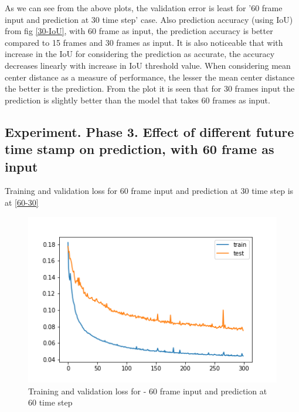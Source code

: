 



As we can see from the above plots, the validation error is least for '60 frame input and prediction at 30 time step' case. Also prediction accuracy (using IoU) from fig \ref{30-IoU}, with 60 frame as input, the prediction accuracy is better compared to 15 frames and 30 frames as input. It is also noticeable that with increase in the IoU for considering the prediction as accurate, the accuracy decreases linearly with increase in IoU threshold value. When considering mean center distance as a measure of performance, the lesser the mean center distance the better is the prediction. From the plot it is seen that for 30 frames input the prediction is slightly better than the model that takes 60 frames as input.

\subsection{Experiment. Phase 3. Effect of different future time stamp on prediction, with 60 frame as input}
Training and validation loss for 60 frame input and prediction at 30 time step is at \ref{60-30}

\begin{figure}[H] 
\includegraphics[scale=0.8]{conf12_300e_60_60ffuture}
\begin{center}
\caption{Training and validation loss for - 60 frame input and prediction at 60 time step }
\label{60-60}
\end{center}
\end{figure}

